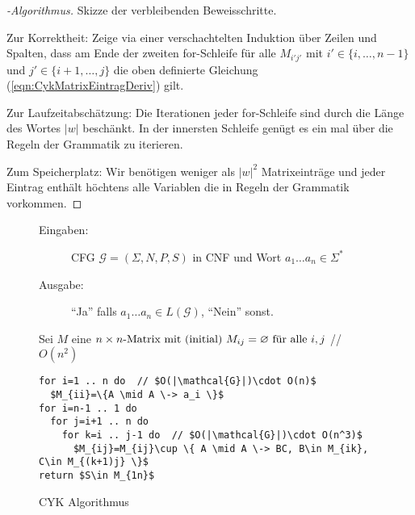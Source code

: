 \begin{proof}[-Algorithmus]
	Skizze der verbleibenden Beweisschritte.
	
	Zur Korrektheit: Zeige via einer verschachtelten Induktion über Zeilen und Spalten, 
	dass am Ende der zweiten for-Schleife für alle $M_{i'j'}$ mit $i'\in\{i,\ldots, n-1\}$ und $j'\in\{i+1,\ldots, j\}$
	die oben definierte Gleichung (\ref{eqn:CykMatrixEintragDeriv}) gilt.
	
	Zur Laufzeitabschätzung: Die Iterationen jeder for-Schleife sind durch die Länge des Wortes $|w|$ beschänkt. 
	In der innersten Schleife genügt es ein mal über die Regeln der Grammatik zu iterieren.
	
	Zum Speicherplatz: Wir benötigen weniger als $|w|^2$ Matrixeinträge 
	und jeder Eintrag enthält höchtens alle Variablen die in Regeln der Grammatik vorkommen.
	\qedhere
\end{proof}


\begin{figure}
	\small
	\begin{description}
		\item[Eingaben:] \ac{CFG} $\mathcal{G} = (\Sigma, N, P, S)$ in CNF und Wort $a_1\ldots a_n\in\Sigma^*$
		\item[Ausgabe:] ``Ja'' falls $a_1\ldots a_n\in L(\mathcal{G})$, ``Nein'' sonst.
	\end{description}
	
	Sei $M$  eine $n\times n\text{-Matrix mit (initial) } M_{ij}=\varnothing \text{ für alle } i, j$  // $O(n^2)$
	
	\begin{center}
		\begin{minipage}{12cm}
			\begin{lstlisting}[mathescape,morekeywords={for,do,return},morecomment={[l]{//}}]
for i=1 .. n do  // $O(|\mathcal{G}|)\cdot O(n)$
  $M_{ii}=\{A \mid A \-> a_i \}$
for i=n-1 .. 1 do
  for j=i+1 .. n do
    for k=i .. j-1 do  // $O(|\mathcal{G}|)\cdot O(n^3)$
      $M_{ij}=M_{ij}\cup \{ A \mid A \-> BC, B\in M_{ik}, C\in M_{(k+1)j} \}$
return $S\in M_{1n}$
			\end{lstlisting}
			\qedherefixlstlisting
		\end{minipage}
	\end{center}
	
	\caption{CYK Algorithmus}
	\label{fig:AlgCYK}
\end{figure}


